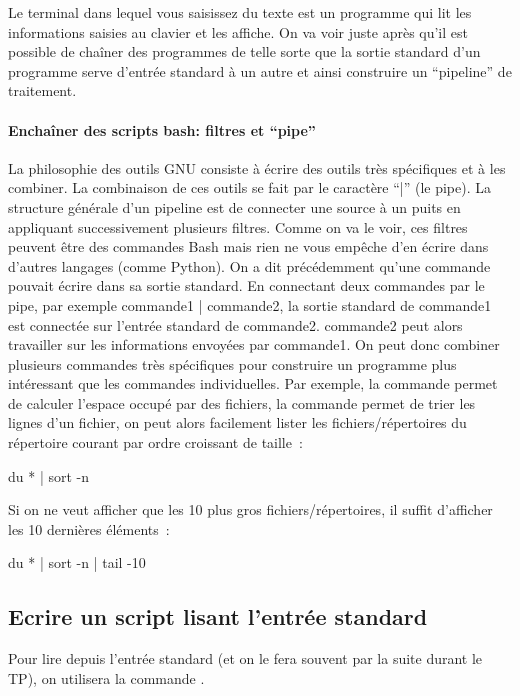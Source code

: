 Le terminal dans lequel vous saisissez du texte est un programme qui lit les informations saisies au clavier et les affiche. On va voir juste après qu'il est possible de chaîner des programmes de telle sorte que la sortie standard d'un programme serve d'entrée standard à un autre et ainsi construire un ``pipeline'' de traitement. 

\paragraph{Enchaîner des scripts bash: filtres et ``pipe''}

La philosophie des outils GNU consiste à écrire des outils très spécifiques et à les combiner. La combinaison de ces outils se fait par le caractère ``|'' (le pipe). La structure générale d'un pipeline est de connecter une source à un puits en appliquant successivement plusieurs filtres. Comme on va le voir, ces filtres peuvent être des commandes Bash mais rien ne vous empêche d'en écrire dans d'autres langages (comme Python). On a dit précédemment qu'une commande pouvait écrire dans sa sortie standard. En connectant deux commandes par le pipe, par exemple commande1 | commande2, la sortie standard de commande1 est connectée sur l'entrée standard de commande2. commande2 peut alors travailler sur les informations envoyées par commande1. On peut donc combiner plusieurs commandes très spécifiques pour construire un programme plus intéressant que les commandes individuelles. Par exemple, la commande \du permet de calculer l'espace occupé par des fichiers, la commande \sort permet de trier les lignes d'un fichier, on peut alors facilement lister les fichiers/répertoires du répertoire courant par ordre croissant de taille~:
\begin{center}
du * | sort -n
\end{center}
Si on ne veut afficher que les 10 plus gros fichiers/répertoires, il suffit d'afficher les 10 dernières éléments~:
\begin{center}
du * | sort -n | tail -10 
\end{center}


\subsection{Ecrire un script lisant l'entrée standard}

Pour lire depuis l'entrée standard (et on le fera souvent par la suite durant le TP), on utilisera la commande \readcmd. 


